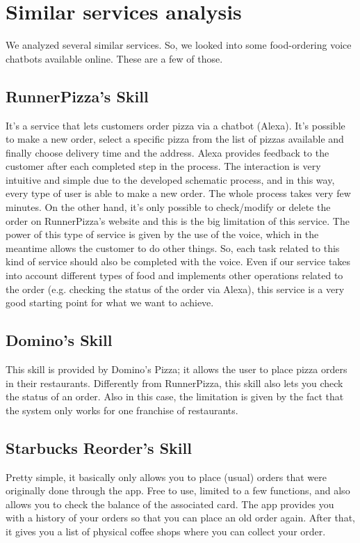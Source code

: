 \section{Similar services analysis}

We analyzed several similar services. So, we looked into some food-ordering
voice chatbots available online. These are a few of those.

\subsection{RunnerPizza's Skill}

It's a service that lets customers order pizza via a chatbot (Alexa).
It's possible to make a new order, select a specific pizza from the
list of pizzas available and finally choose delivery time and the address.
Alexa provides feedback to the customer after each completed step in the process.
The interaction is very intuitive and simple due to the developed schematic process,
and in this way, every type of user is able to make a new order. The whole process
takes very few minutes. On the other hand, it's only possible to check/modify or delete
the order on RunnerPizza's website and this is the big limitation of this service.
The power of this type of service is given by the use of the voice, which in the
meantime allows the customer to do other things. So, each task related to this kind
of service should also be completed with the voice.
Even if our service takes into account different types of food and implements
other operations related to the order (e.g. checking the status of the
order via Alexa),
this service is a very good starting point for what we want to achieve.

\subsection{Domino's Skill}

This skill is provided by Domino's Pizza; it allows the user to place pizza orders 
in their restaurants. Differently from RunnerPizza, this skill also lets you check
the status of an order. Also in this case, the limitation is given by the fact that
the system only works for one franchise of restaurants.


\subsection{Starbucks Reorder's Skill}

Pretty simple, it basically only allows you to place (usual) orders that were originally
done through the app. Free to use, limited to a few functions, and also allows you
to check the balance of the associated card. The app provides you with a history of your
orders so that you can place an old order again. After that, it gives you a list of
physical coffee shops where you can collect your order.